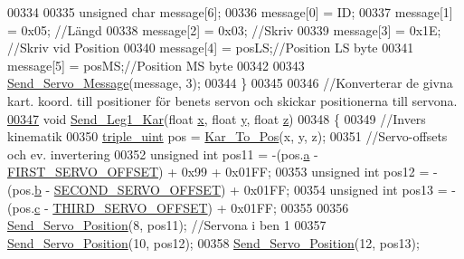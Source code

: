 \begin{DoxyCode}
00334     
00335     \textcolor{keywordtype}{unsigned} \textcolor{keywordtype}{char} message[6];
00336     message[0] = ID;
00337     message[1] = 0x05; \textcolor{comment}{//Längd }
00338     message[2] = 0x03; \textcolor{comment}{//Skriv }
00339     message[3] = 0x1E; \textcolor{comment}{//Skriv vid Position}
00340     message[4] = posLS;\textcolor{comment}{//Position LS byte }
00341     message[5] = posMS;\textcolor{comment}{//Position MS byte}
00342     
00343     \hyperlink{servo___u_a_r_t_8c_a2ed3a2903977a774d1b174665d50661c}{Send\_Servo\_Message}(message, 3);
00344 \}
00345 
00346 \textcolor{comment}{//Konverterar de givna kart. koord. till positioner för benets servon och skickar positionerna till
       servona.}
\hypertarget{servo___u_a_r_t_8c_source.tex_l00347}{}\hyperlink{servo___u_a_r_t_8h_adde8722cd4b494d02bce7a39b14aed52}{00347} \textcolor{keywordtype}{void} \hyperlink{servo___u_a_r_t_8c_a34cc25393763bbdb408707a0380d3c1a}{Send\_Leg1\_Kar}(\textcolor{keywordtype}{float} \hyperlink{sensor_8h_a6c4b361d72eb3767ba424ac9a6ecf52b}{x}, \textcolor{keywordtype}{float} \hyperlink{sensor_8h_a0ed6a908288e0cd87f79c1b5ab56d07c}{y}, \textcolor{keywordtype}{float} \hyperlink{over__hinder_8c_af73583b1e980b0aa03f9884812e9fd4d}{z})
00348 \{
00349     \textcolor{comment}{//Invers kinematik}
00350     \hyperlink{structtriple__uint}{triple\_uint} pos = \hyperlink{invers__kinematik_8c_a68f82386196ad991ed54fb9796d90f7c}{Kar\_To\_Pos}(x, y, z);
00351     \textcolor{comment}{//Servo-offsets och ev. invertering }
00352     \textcolor{keywordtype}{unsigned} \textcolor{keywordtype}{int} pos11 = -(pos.\hyperlink{structtriple__uint_a0ea8a85723620c90be9fd2a693f12a59}{a} - \hyperlink{servo___u_a_r_t_8c_a4c437d01d2f060ec86c16ed5e76efe45}{FIRST\_SERVO\_OFFSET}) + 0x99 + 0x01FF;
00353     \textcolor{keywordtype}{unsigned} \textcolor{keywordtype}{int} pos12 = -(pos.\hyperlink{structtriple__uint_a790d5baa17ec7aaf7bb49750a16e9c29}{b} - \hyperlink{servo___u_a_r_t_8c_acb02dedbe5ff19694bdb5b2ddf61664a}{SECOND\_SERVO\_OFFSET}) + 0x01FF;
00354     \textcolor{keywordtype}{unsigned} \textcolor{keywordtype}{int} pos13 = -(pos.\hyperlink{structtriple__uint_a6ce17b018c47d0f1d0e53a458f741ad3}{c} - \hyperlink{servo___u_a_r_t_8c_ac2f065c44b617c91ea7f4237e8ead729}{THIRD\_SERVO\_OFFSET}) + 0x01FF;
00355     
00356     \hyperlink{servo___u_a_r_t_8c_a5ed0e49737d1eaf80665c285396b4337}{Send\_Servo\_Position}(8, pos11); \textcolor{comment}{//Servona i ben 1}
00357     \hyperlink{servo___u_a_r_t_8c_a5ed0e49737d1eaf80665c285396b4337}{Send\_Servo\_Position}(10, pos12);
00358     \hyperlink{servo___u_a_r_t_8c_a5ed0e49737d1eaf80665c285396b4337}{Send\_Servo\_Position}(12, pos13);

\end{DoxyCode}

